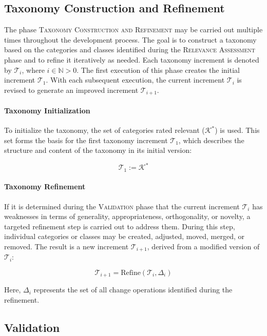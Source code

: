 \subsection{Taxonomy Construction and Refinement}

The phase \textsc{Taxonomy Construction and Refinement} may be carried out multiple times throughout the development process. The goal is to construct a taxonomy based on the categories and classes identified during the \textsc{Relevance Assessment} phase and to refine it iteratively as needed. Each taxonomy increment is denoted by $\mathcal{T}_i$, where $i \in \mathbb{N}{>0}$. The first execution of this phase creates the initial increment $\mathcal{T}_1$. With each subsequent execution, the current increment $\mathcal{T}_i$ is revised to generate an improved increment $\mathcal{T}_{i+1}$.

\paragraph{Taxonomy Initialization} To initialize the taxonomy, the set of categories rated relevant ($\mathcal{K}^\ast$) is used. This set forms the basis for the first taxonomy increment $\mathcal{T}_1$, which describes the structure and content of the taxonomy in its initial version:

\[
\mathcal{T}_1 := \mathcal{K}^\ast
\]

\paragraph{Taxonomy Refinement} If it is determined during the \textsc{Validation} phase that the current increment $\mathcal{T}_i$ has weaknesses in terms of generality, appropriateness, orthogonality, or novelty, a targeted refinement step is carried out to address them. During this step, individual categories or classes may be created, adjusted, moved, merged, or removed. The result is a new increment $\mathcal{T}_{i+1}$, derived from a modified version of $\mathcal{T}_i$:

\[
\mathcal{T}_{i+1} = \text{Refine}(\mathcal{T}_i, \Delta_i)
\]

Here, $\Delta_i$ represents the set of all change operations identified during the refinement.

\subsection{Validation}

